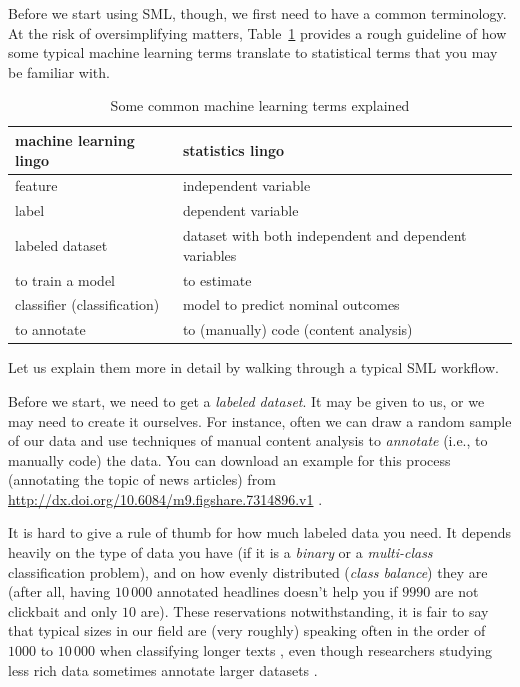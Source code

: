 Before we start using SML, though, we first need to have
a common terminology.
At the risk of oversimplifying matters, Table~\ref{tab:mllingo} provides a rough
guideline of how some typical machine learning terms translate to statistical
terms that you may be familiar with.

\begin{table}
\caption{Some common machine learning terms explained\label{tab:mllingo}}{
  \centering
\begin{tabularx}{\textwidth}{XX}
\toprule
machine learning lingo  & statistics lingo\\ \midrule
feature                 & independent variable  \\
label                   & dependent variable  \\
labeled dataset         & dataset with both independent and dependent variables\\
to train a model        & to estimate \\
classifier (classification)  & model to predict nominal outcomes \\
to annotate             & to (manually) code (content analysis) \\
\bottomrule
\end{tabularx}}{}
\end{table}

Let us explain them more in detail by walking through a typical SML workflow.

Before we start, we need to get a \emph{labeled dataset}.
It may be given to us, or we may need to create it ourselves.
For instance, often we can draw a random sample of our data and use techniques
of manual content analysis \citep[e.g.,][]{riffe2019analyzing} to
\emph{annotate} (i.e., to manually code) the data.
You can download an example for this process (annotating the topic of news
articles) from \url{http://dx.doi.org/10.6084/m9.figshare.7314896.v1} \citep{Vermeer2018}.

It is hard to give a rule of thumb for how much labeled data you need.
It depends heavily on the type of data you have (if it is a \emph{binary} or a \emph{multi-class} classification problem), and on how evenly distributed (\emph{class balance}) they are (after all, having $10\,000$ annotated headlines doesn't help you if $9990$ are not clickbait and only $10$ are).
These reservations notwithstanding, it is fair to say that typical sizes in
our field are (very roughly) speaking often in the order of $1000$ to $10\,000$
when classifying longer texts \citep[see][]{Burscher2014},
even though researchers studying less rich data sometimes annotate larger
datasets \citep[e.g., $60\,000$ social media messages in][]{vermeer2019seeing}.

